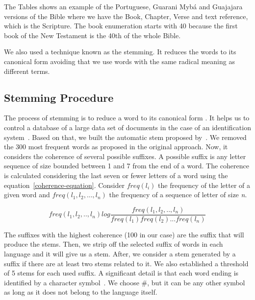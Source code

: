 \documentclass[runningheads]{llncs}
\begin{document}
    The Tables shows an example of the Portuguese, Guarani Mybá and Guajajara versions of the Bible where we have the Book, Chapter, Verse and text reference, which is the Scripture. The book enumeration starts with 40 because the first book of the New Testament is the 40th of the whole Bible.

    We also used a technique known as the stemming. It reduces the words to its canonical form avoiding that we use words with the same radical meaning as different terms.

    \subsection{Stemming Procedure}\label{subsec:stemming-procedure}

    The process of stemming is to reduce a word to its canonical form \cite{goldsmith2000automatic}.
    It helps us to control a database of a large data set of documents in the case of an identification
    system~\cite{goldsmith2000automatic}.
    Based on that, we built the automatic stem proposed by~\cite{goldsmith2000automatic}. We removed the 300 most frequent words as proposed in the original approach.
    Now, it considers the coherence of several possible suffixes.
    A possible suffix is any letter sequence of size bounded between 1 and 7 from the end of a word.
    The coherence is calculated considering the last seven or fewer letters of a word using the equation~\ref{coherence-equation}. Consider \(freq(l_i)\) the frequency of the letter of a given word and \(freq(l_1,l_2, \dots, l_n)\) the frequency of a sequence of letter of size \textit{n}.

    \begin{equation}\label{coherence-equation}
    freq(l_1,l_2,..,l_n)log\frac{freq(l_1,l_2,..,l_n)}{freq(l_1)freq(l_2)...freq(l_n)}
    \end{equation}

    The suffixes with the highest coherence (100 in our case) are the suffix that will produce the stems.
    Then, we strip off the selected suffix of words in each language and it will give us a stem.
    After, we consider a stem generated by a suffix if there are at least two stems related to it.
    We also established a threshold of 5 stems for each used suffix. A significant detail is that each word ending is identified by a character symbol~\cite{goldsmith2000automatic}. We choose \#, but it can be any other symbol as long as it does not belong to the language itself.
\end{document}
